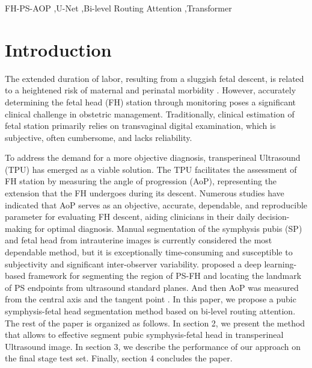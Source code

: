 \documentclass[preprint,12pt]{elsarticle}
\begin{document}
\begin{frontmatter}


\begin{keyword}
FH-PS-AOP \sep U-Net \sep Bi-level Routing Attention \sep Transformer
\end{keyword}

\end{frontmatter}


\section{Introduction}
\label{sec:sample1}
The extended duration of labor, resulting from a sluggish fetal descent, is related to a heightened risk of maternal and perinatal morbidity \cite{RN1}. However, accurately determining the fetal head (FH) station through monitoring poses a significant clinical challenge in obstetric management\cite{RN2}. Traditionally, clinical estimation of fetal station primarily relies on transvaginal digital examination, which is subjective, often cumbersome, and lacks reliability\cite{RN3,RN4}.

To address the demand for a more objective diagnosis, transperineal Ultrasound (TPU) has emerged as a viable solution. The TPU facilitates the assessment of FH station by measuring the angle of progression (AoP), representing the extension that the FH undergoes during its descent\cite{RN6}. Numerous studies have indicated that AoP serves as an objective, accurate, dependable, and reproducible parameter for evaluating FH descent, aiding clinicians in their daily decision-making for optimal diagnosis\cite{RN7,RN8,RN9,RN10}.
Manual segmentation of the symphysis pubis (SP) and fetal head from intrauterine images is currently considered the most dependable method, but it is exceptionally time-consuming and susceptible to subjectivity and significant inter-observer variability. \cite{RN11,RN12} proposed a deep learning-based framework for segmenting the region of PS-FH and locating the landmark of PS endpoints from ultrasound standard planes. And then AoP was measured from the central axis and the tangent point .
In this paper, we propose a pubic symphysis-fetal head segmentation method based on bi-level routing attention\cite{RN13}. The rest of the paper is organized as follows. In section 2, we present the method that allows to effective segment pubic symphysis-fetal head in transperineal Ultrasound image. In section 3, we describe the performance of our approach on the final stage test set. Finally, section 4 concludes the paper.
\end{document}

